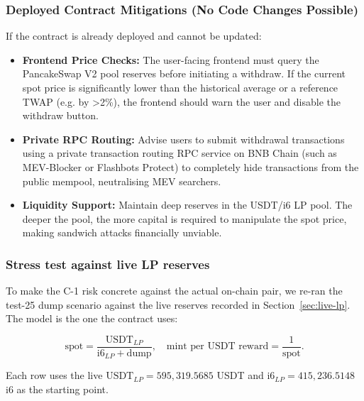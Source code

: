\documentclass[11pt,a4paper]{article}
\begin{document}
\subsubsection*{Deployed Contract Mitigations (No Code Changes Possible)}
If the contract is already deployed and cannot be updated:
\begin{itemize}[leftmargin=*]
    \item \textbf{Frontend Price Checks:} The user-facing frontend must query the PancakeSwap V2 pool reserves before initiating a withdraw. If the current spot price is significantly lower than the historical average or a reference TWAP (e.g. by >2\%), the frontend should warn the user and disable the withdraw button.
    \item \textbf{Private RPC Routing:} Advise users to submit withdrawal transactions using a private transaction routing RPC service on BNB Chain (such as MEV-Blocker or Flashbots Protect) to completely hide transactions from the public mempool, neutralising MEV searchers.
    \item \textbf{Liquidity Support:} Maintain deep reserves in the USDT/i6 LP pool. The deeper the pool, the more capital is required to manipulate the spot price, making sandwich attacks financially unviable.
\end{itemize}

\subsubsection*{Stress test against live LP reserves}
\label{sec:c1-stress}

To make the C-1 risk concrete against the actual on-chain pair, we re-ran
the test-25 dump scenario against the live reserves recorded in
Section~\ref{sec:live-lp}. The model is the one the contract uses:

\[
\text{spot} = \frac{\text{USDT}_{LP}}{\text{i6}_{LP} + \text{dump}},
\quad
\text{mint per USDT reward} = \frac{1}{\text{spot}}.
\]

Each row uses the live $\text{USDT}_{LP} = 595{,}319.5685$ USDT and
$\text{i6}_{LP} = 415{,}236.5148$ i6 as the starting point.
\end{document}
